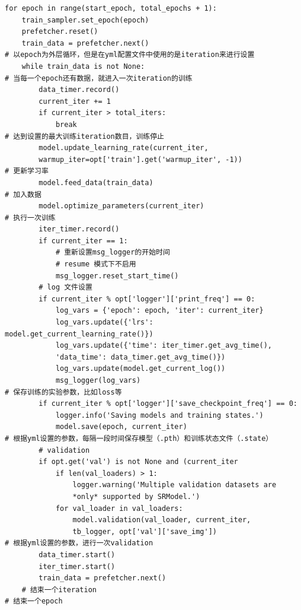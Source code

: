\documentclass[../main.tex]{subfiles}
\begin{document}
\begin{enumerate}
\begin{enumerate}
\begin{verbatim}
for epoch in range(start_epoch, total_epochs + 1):
    train_sampler.set_epoch(epoch)
    prefetcher.reset()
    train_data = prefetcher.next()
# 以epoch为外层循环，但是在yml配置文件中使用的是iteration来进行设置
    while train_data is not None:  
# 当每一个epoch还有数据，就进入一次iteration的训练
        data_timer.record()
        current_iter += 1
        if current_iter > total_iters:
            break
# 达到设置的最大训练iteration数目，训练停止
        model.update_learning_rate(current_iter,
        warmup_iter=opt['train'].get('warmup_iter', -1))
# 更新学习率
        model.feed_data(train_data)
# 加入数据
        model.optimize_parameters(current_iter)
# 执行一次训练
        iter_timer.record()
        if current_iter == 1:
            # 重新设置msg_logger的开始时间
            # resume 模式下不启用
            msg_logger.reset_start_time()
        # log 文件设置
        if current_iter % opt['logger']['print_freq'] == 0:
            log_vars = {'epoch': epoch, 'iter': current_iter}
            log_vars.update({'lrs': model.get_current_learning_rate()})
            log_vars.update({'time': iter_timer.get_avg_time(), 
            'data_time': data_timer.get_avg_time()})
            log_vars.update(model.get_current_log())
            msg_logger(log_vars)
# 保存训练的实验参数，比如loss等
        if current_iter % opt['logger']['save_checkpoint_freq'] == 0:
            logger.info('Saving models and training states.')
            model.save(epoch, current_iter)
# 根据yml设置的参数，每隔一段时间保存模型（.pth）和训练状态文件（.state）
        # validation
        if opt.get('val') is not None and (current_iter
            if len(val_loaders) > 1:
                logger.warning('Multiple validation datasets are
                *only* supported by SRModel.')
            for val_loader in val_loaders:
                model.validation(val_loader, current_iter, 
                tb_logger, opt['val']['save_img'])
# 根据yml设置的参数，进行一次validation
        data_timer.start()
        iter_timer.start()
        train_data = prefetcher.next()
    # 结束一个iteration
# 结束一个epoch
\end{verbatim}

\end{enumerate}



\end{enumerate}
\end{document}
